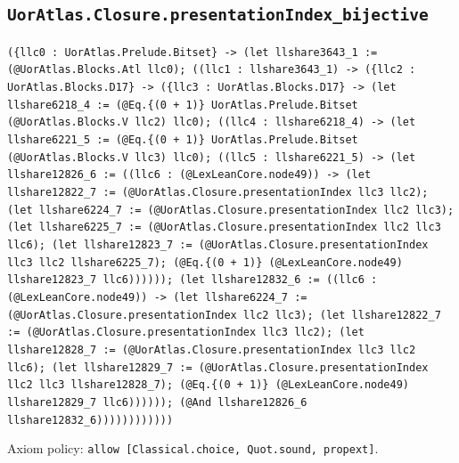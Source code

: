 \documentclass[11pt]{article}
\begin{document}
\subsection*{\texttt{UorAtlas.Closure.presentationIndex\_bijective}}
\noindent\texttt{(\{llc0 : UorAtlas.Prelude.Bitset\} -> (let llshare3643\_1 := (@UorAtlas.Blocks.Atl llc0); ((llc1 : llshare3643\_1) -> (\{llc2 : UorAtlas.Blocks.D17\} -> (\{llc3 : UorAtlas.Blocks.D17\} -> (let llshare6218\_4 := (@Eq.\{(0 + 1)\} UorAtlas.Prelude.Bitset (@UorAtlas.Blocks.V llc2) llc0); ((llc4 : llshare6218\_4) -> (let llshare6221\_5 := (@Eq.\{(0 + 1)\} UorAtlas.Prelude.Bitset (@UorAtlas.Blocks.V llc3) llc0); ((llc5 : llshare6221\_5) -> (let llshare12826\_6 := ((llc6 : (@LexLeanCore.node49)) -> (let llshare12822\_7 := (@UorAtlas.Closure.presentationIndex llc3 llc2); (let llshare6224\_7 := (@UorAtlas.Closure.presentationIndex llc2 llc3); (let llshare6225\_7 := (@UorAtlas.Closure.presentationIndex llc2 llc3 llc6); (let llshare12823\_7 := (@UorAtlas.Closure.presentationIndex llc3 llc2 llshare6225\_7); (@Eq.\{(0 + 1)\} (@LexLeanCore.node49) llshare12823\_7 llc6)))))); (let llshare12832\_6 := ((llc6 : (@LexLeanCore.node49)) -> (let llshare6224\_7 := (@UorAtlas.Closure.presentationIndex llc2 llc3); (let llshare12822\_7 := (@UorAtlas.Closure.presentationIndex llc3 llc2); (let llshare12828\_7 := (@UorAtlas.Closure.presentationIndex llc3 llc2 llc6); (let llshare12829\_7 := (@UorAtlas.Closure.presentationIndex llc2 llc3 llshare12828\_7); (@Eq.\{(0 + 1)\} (@LexLeanCore.node49) llshare12829\_7 llc6)))))); (@And llshare12826\_6 llshare12832\_6))))))))))))}\par
\noindent Axiom policy: \texttt{allow [Classical.choice, Quot.sound, propext]}.\par
\end{document}
